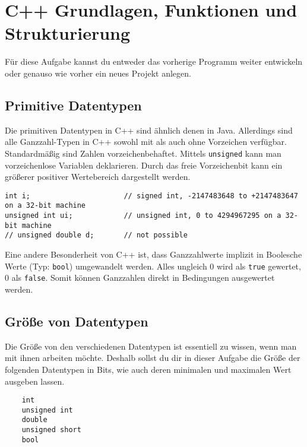 \section{C++ Grundlagen, Funktionen und Strukturierung}
Für diese Aufgabe kannst du entweder das vorherige Programm weiter entwickeln oder genauso wie vorher ein neues Projekt anlegen.

\subsection*{Primitive Datentypen} 
Die primitiven Datentypen in C++ sind ähnlich denen in Java.
Allerdings sind alle Ganzzahl-Typen in C++ sowohl mit als auch ohne Vorzeichen verfügbar.
Standardmäßig sind Zahlen vorzeichenbehaftet.
Mittels \lstinline{unsigned} kann man vorzeichenlose Variablen deklarieren.
Durch das freie Vorzeichenbit kann ein größerer positiver Wertebereich dargestellt werden.

\begin{lstlisting}
int i;                      // signed int, -2147483648 to +2147483647 on a 32-bit machine
unsigned int ui;            // unsigned int, 0 to 4294967295 on a 32-bit machine
// unsigned double d;       // not possible
\end{lstlisting}

Eine andere Besonderheit von C++ ist, dass Ganzzahlwerte implizit in Boolesche Werte (Typ: \lstinline{bool}) umgewandelt werden.
Alles ungleich 0 wird als \lstinline{true} gewertet, 0 als \lstinline{false}.
Somit können Ganzzahlen direkt in Bedingungen ausgewertet werden.

\subsection{Größe von Datentypen}
Die Größe von den verschiedenen Datentypen ist essentiell zu wissen, wenn man mit ihnen arbeiten möchte.
Deshalb sollst du dir in dieser Aufgabe die Größe der folgenden Datentypen in Bits, wie auch deren minimalen und maximalen Wert ausgeben lassen.

\begin{lstlisting}
    int
    unsigned int
    double
    unsigned short
    bool
\end{lstlisting}


